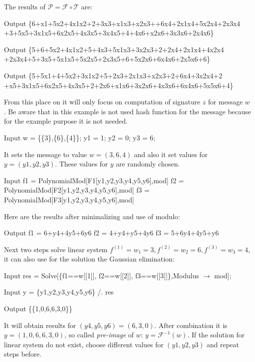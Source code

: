 \documentclass[thesis=M,english]{FITthesis}[2019/12/23]
\begin{document}
\noindent
The results of $\mathcal{P} = \mathcal{F} \circ \mathcal{T}$ are:
\begin{mmaCell}[addtoindex=3]{Output}
  \{6+x1+5x2+4x1x2+2+3x3+x1x3+x2x3++6x4+2x1x4+5x2x4+2x3x4
+3+5x5+3x1x5+6x2x5+4x3x5+3x4x5+4+4x6+x2x6+3x3x6+2x4x6\}
\end{mmaCell}
\begin{mmaCell}{Output}
  \{5+6+5x2+4x1x2+5+4x3+5x1x3+3x2x3+2+2x4+2x1x4+4x2x4
+2x3x4+5+3x5+5x1x5+5x2x5+2x3x5+6+5x2x6+6x4x6+2x5x6+6\}
\end{mmaCell}
\begin{mmaCell}{Output}
  \{5+5x1+4+5x2+3x1x2+5+2x3+2x1x3+x2x3+2+6x4+3x2x4+2
+x5+3x1x5+6x2x5+4x3x5+2+2x6+x1x6+3x2x6+4x3x6+6x4x6+5x5x6+4\}
\end{mmaCell}
From this place on it will only focus on computation of signature $z$ for message $w$. Be aware that in this example is not used hash function for the message because for the example purpose it is not needed.
\begin{mmaCell}[moredefined={w, y1, y2, y3}]{Input}
  w  = \{\{3\},\{6\},\{4\}\};
  y1 = 1;
  y2 = 0;
  y3 = 6;
\end{mmaCell}
It sets the message to value $w = (3,6,4)$ and also it set values for $y = (y1,y2,y3)$. These values for $y$ are randomly chosen.
\begin{mmaCell}[addtoindex=3,moredefined={f1, F1, y1, y2, y3, mod, f2, F2, f3, F3}]{Input}
  f1 = PolynomialMod[F1[y1,y2,y3,y4,y5,y6],mod]
  f2 = PolynomialMod[F2[y1,y2,y3,y4,y5,y6],mod]
  f3 = PolynomialMod[F3[y1,y2,y3,y4,y5,y6],mod]
\end{mmaCell}
Here are the results after minimalizing and use of modulo:
\begin{mmaCell}{Output}
  f1 = 6+y4+4y5+6y6
  f2 = 4+y4+y5+4y6
  f3 = 5+6y4+4y5+y6
\end{mmaCell}
Next two steps solve linear system $f^{(1)} = w_1 = 3, f^{(2)} = w_2 = 6, f^{(3)} = w_3 = 4$, it can also use for the solution the Gaussian elimination:
\begin{mmaCell}[moredefined={res, f1, w, f2, f3, mod}]{Input}
  res = Solve[\{f1==w[[1]], f2==w[[2]], f3==w[[3]]\},Modulus \(\pmb{\to}\) mod];
\end{mmaCell}
\begin{mmaCell}[moredefined={y, y1, y2, y3, res}]{Input}
  y = \{y1,y2,y3,y4,y5,y6\} /. res 
\end{mmaCell}
\begin{mmaCell}{Output}
  \{\{1,0,6,6,3,0\}\}
\end{mmaCell}
It will obtain results for $(y4,y5,y6) = (6,3,0)$. After combination it is $y = (1,0,6,6,3,0)$, so called \textit{pre-image} of $w$: $y =  \mathcal{F}^{-1}(w)$. If the solution for linear system do not exist, choose different values for $(y1,y2,y3)$ and repeat steps before.
\end{document}
